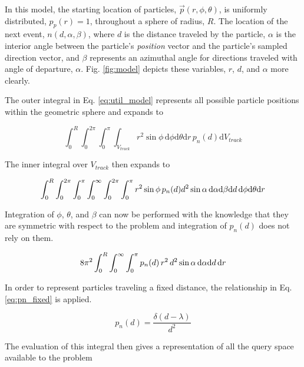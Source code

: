 In this model, the starting location of particles, $\vec{p}(r,\phi,\theta)$, is
uniformly distributed, $p_p(r)=1$, throughout a sphere of radius, $R$.  The
location of the next event, $n(d,\alpha,\beta)$, where $d$ is the distance
traveled by the particle, $\alpha$ is the interior angle between the
particle's \textit{position} vector and the particle's sampled direction
vector, and $\beta$ represents an azimuthal angle for directions traveled with
angle of departure, $\alpha$. Fig. \ref{fig:model} depicts these
variables, $r$, $d$, and $\alpha$ more clearly.

The outer integral in Eq. \ref{eq:util_model} represents all possible particle positions within the
geometric sphere and expands to

\begin{equation}
\int_{0}^{R}\int_{0}^{2\pi}\int_{0}^{\pi}\int_{V_{track}} r^2\sin{\phi} \, \mathrm{d}\phi
\mathrm{d}\theta \mathrm{d}r \,  p_n(d) \mathrm{d}V_{track}
\end{equation}

The inner integral over $V_{track}$ then expands to

\begin{equation}
\small \int_{0}^{R}\int_{0}^{2\pi}\int_{0}^{\pi}\int_{0}^{\infty}\int_{0}^{2\pi}\int_{0}^{\pi}
r^2\sin{\phi} \, p_n(d) d^2 \sin{\alpha} \, \mathrm{d}\alpha \mathrm{d}\beta \mathrm{d}d \, \mathrm{d}\phi
\mathrm{d}\theta \mathrm{d}r
\end{equation}

Integration of $\phi$, $\theta$, and $\beta$ can now be performed with
the knowledge that they are symmetric with respect to the problem and
integration of $p_n(d)$ does not rely on them.

\begin{equation}
\small 8\pi^2  \int_{0}^{R}\int_{0}^{\infty}\int_{0}^{\pi} p_n(d) \,
r^2 \, d^2 \sin{\alpha} \, \mathrm{d}\alpha \mathrm{d}d \, \mathrm{d}r
\end{equation}

In order to represent particles traveling a fixed distance, the relationship in Eq. \ref{eq:pn_fixed}
is applied.

\begin{equation}
  \label{eq:pn_fixed}
  p_n(d) = \frac{\delta(d-\lambda)}{d^{2}}
\end{equation}

The evaluation of this integral then gives a representation of all the query
space available to the problem


